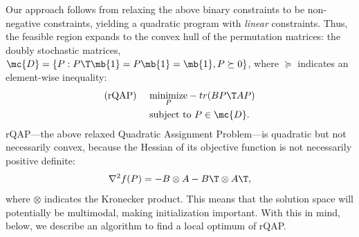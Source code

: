 \documentclass[11pt]{article}
\begin{document}
Our approach follows from relaxing the above binary constraints
to be non-negative constraints, yielding a quadratic program with \emph{linear} constraints.  %
Thus, the feasible region expands to the convex hull of the permutation matrices: the doubly stochastic matrices, $\mc{D}=\{P : P\T \mb{1} =  P \mb{1} = \mb{1}, P \succeq 0\}$, where $\succeq$ indicates an element-wise inequality:
\begin{subequations} \label{eq:FAQ}
\begin{align}
		\text{(rQAP) } \quad &\underset{P}{\text{minimize}}   - tr(B P\T AP) \label{eq:FAQ1}  \\
		&\text{subject to }  P \in \mc{D}.
\end{align}
\end{subequations}
% 
rQAP---the above relaxed Quadratic Assignment Problem---is quadratic but not necessarily convex, 
because the Hessian of its objective function is not necessarily positive definite:
\begin{align}
	\nabla^2 f(P)  =  - B \otimes A - B\T \otimes A\T,
\end{align}
where $\otimes$ indicates the Kronecker product. This means that the solution space will potentially be multimodal, making initialization important.  With this in mind, below, we describe an algorithm to find a local optimum of rQAP.
\end{document}
